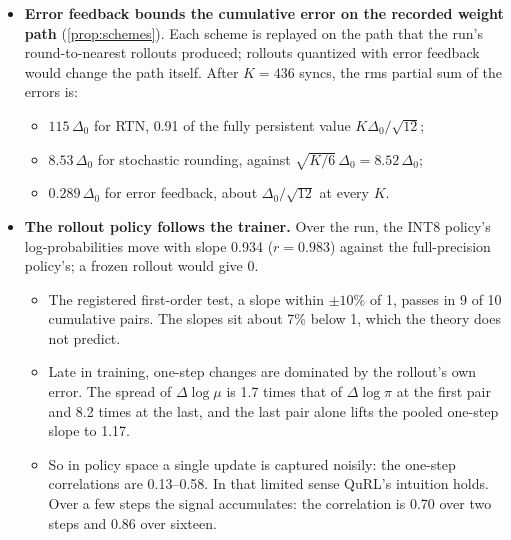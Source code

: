 \begin{itemize}[leftmargin=*,itemsep=2pt]
  \begin{itemize}[leftmargin=*,itemsep=1pt]
  \item Its correlation with the initial error follows $1-6a(1-a)$ within 0.02 in every displacement bin at every recorded sync.
  \item After 435 steps it is still 0.691, against 0.692 predicted from the measured displacements.
  \item Its variance stays within 0.07\% of its initial value, and the grids hardly move. By the end of the run no weight had moved by more than $4.8\times10^{-4}$, so the absmax of 99\% of rows changed by at most 1.3\%.
  \end{itemize}
\item \textbf{Error feedback bounds the cumulative error on the recorded weight path} (\cref{prop:schemes}). Each scheme is replayed on the path that the run's round-to-nearest rollouts produced; rollouts quantized with error feedback would change the path itself. After $K=436$ syncs, the rms partial sum of the errors is:
  \begin{itemize}[leftmargin=*,itemsep=1pt]
  \item $115\,\Delta_0$ for RTN, 0.91 of the fully persistent value $K\Delta_0/\sqrt{12}$;
  \item $8.53\,\Delta_0$ for stochastic rounding, against $\sqrt{K/6}\,\Delta_0=8.52\,\Delta_0$;
  \item $0.289\,\Delta_0$ for error feedback, about $\Delta_0/\sqrt{12}$ at every $K$.
  \end{itemize}
\item \textbf{The rollout policy follows the trainer.} Over the run, the INT8 policy's log-probabilities move with slope 0.934 ($r=0.983$) against the full-precision policy's; a frozen rollout would give 0.
  \begin{itemize}[leftmargin=*,itemsep=1pt]
  \item The registered first-order test, a slope within $\pm10\%$ of 1, passes in 9 of 10 cumulative pairs. The slopes sit about 7\% below 1, which the theory does not predict.
  \item Late in training, one-step changes are dominated by the rollout's own error. The spread of $\Delta\log\mu$ is 1.7 times that of $\Delta\log\pi$ at the first pair and 8.2 times at the last, and the last pair alone lifts the pooled one-step slope to 1.17.
  \item So in policy space a single update is captured noisily: the one-step correlations are 0.13--0.58. In that limited sense QuRL's intuition holds. Over a few steps the signal accumulates: the correlation is 0.70 over two steps and 0.86 over sixteen.

\end{itemize}
\end{itemize}
